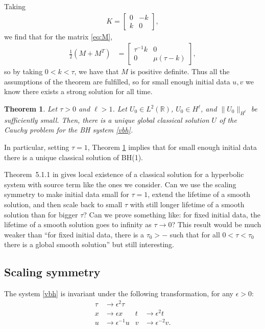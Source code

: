 \documentclass{article}
\theoremstyle{plain}
\newtheorem{theorem}{Theorem}
\theoremstyle{definition}
\numberwithin{theorem}{section}
\newcommand{\todo}[1]{{\Large{\color{red}{#1}}}}
\begin{document}
Taking
\begin{align*}
    K = \begin{bmatrix} 0 & -k \\ k & 0 \end{bmatrix},
\end{align*}
we find that for the matrix \eqref{eq:M},
\begin{align}
    \frac{1}{2}\left(M + M^T\right) & = \begin{bmatrix} \tau^{-1} k & 0 \\ 0 & \mu(\tau-k) \end{bmatrix},
\end{align}
so by taking $0 < k < \tau$, we have that $M$ is positive definite.  Thus all the assumptions
of the theorem are fulfilled, so for small enough initial data $u, v$ we know there exists
a strong solution for all time.

\begin{theorem}
\label{thm:burgers_small_data}
    Let
    $\tau > 0$ and $\ell > 1$.
    Let $U_0 \in L^2(\mathbb{R})$,
    $U_0 \in H^\ell$, and $\|U_0\|_{H^\ell}$ be sufficiently small.
    Then, there is a unique global classical solution $U$ of the Cauchy problem for the BH system \eqref{vbh}.
\end{theorem}
In particular, setting $\tau=1$, Theorem \ref{thm:burgers_small_data} implies that for small
enough initial data there is a unique classical solution  of BH(1).



\todo{TODO: Another kind of regularity result?}
Theorem~5.1.1 in \cite{dafermos2016hyperbolic} gives local existence of a classical solution for a hyperbolic system with source term like the ones we consider.
Can we use the scaling symmetry to make initial data small for $\tau = 1$, extend the lifetime of a smooth solution, and then scale back to small $\tau$ with still longer lifetime of a smooth solution than for bigger $\tau$?
Can we prove something like: for fixed initial data, the lifetime of a smooth solution goes to infinity as $\tau \to 0$?
This result would be much weaker than ``for fixed initial data, there is a $\tau_0 > -$ such that for all $0 < \tau <  \tau_0$ there is a global smooth solution'' but still interesting.



\subsection{Scaling symmetry}
The system \eqref{vbh} is invariant under the following transformation, for any $\epsilon>0$:
\begin{subequations}
\label{vbh-scaling}
\begin{align}
    \tau & \to \epsilon^2 \tau \\
    x & \to \epsilon x & t & \to \epsilon^2 t \\
    u & \to \epsilon^{-1} u & v & \to \epsilon^{-2} v.
\end{align}
\end{subequations}
\end{document}
